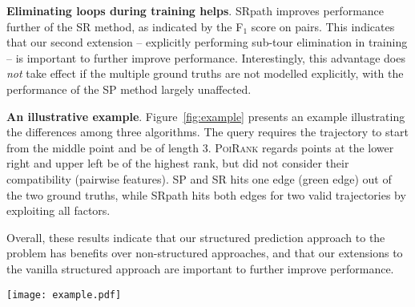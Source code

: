 \textbf{Eliminating loops during training helps}.
{\sc SRpath} improves performance further of the {\sc SR} method,
as indicated by the F$_1$ score on pairs.
This indicates that our second extension -- explicitly performing sub-tour elimination in training -- is important to further improve performance.
Interestingly,
this advantage does \emph{not} take effect if the multiple ground truths are not modelled explicitly,
with the performance of the {\sc SP} method largely unaffected.

\textbf{An illustrative example}. Figure~\ref{fig:example} presents an example illustrating the differences among three algorithms. The query requires the trajectory to start from the middle point and be of length 3.
\textsc{PoiRank} regards points at the lower right and upper left be of the highest rank, but did not consider their compatibility (\ie pairwise features). {\sc SP} and {\sc SR} hits one edge (green edge) out of the two ground truths, while {\sc SRpath} hits both edges for two valid trajectories by exploiting all factors.

Overall, these results indicate that our structured prediction approach to the problem has
benefits over non-structured approaches,
and that our extensions to the vanilla structured approach are important to further improve performance.


\begin{figure*}[t]
	\centering
	\texttt{[image: example.pdf]}
	\caption{Example of structured recommender versus baseline on a query with two ground truths. %
             (a) \textsc{PoiRank} cannot make a recommendation related to any of the ground truths;
             (b) \textsc{SP} and \textsc{SR} recommend a better trajectory than \textsc{PoiRank}, but not fully consistent with the ground truths;
             (c) \textsc{SRpath} hits both ground truths at rank 3 (green edges) and 5 (red edges) respectively.}
	\label{fig:example}
\end{figure*}
